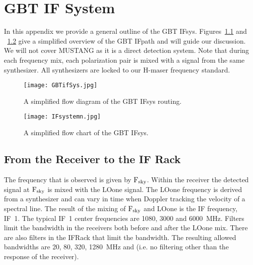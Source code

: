 \chapter{GBT IF System}\label{appendix:if}

In this appendix we provide a general outline of the \gls{GBT} \gls{IFsys}.
Figures~\ref{fig:ifpath} and ~\ref{fig:ifsys} give a simplified overview
of the \gls{GBT} \gls{IFpath} and will guide our discussion.  We will
not cover \gls{MUSTANG} as it is a direct detection system.  Note that during
each frequency mix, each polarization pair is mixed with a signal from the
same synthesizer. All synthesizers are locked to our H-maser frequency standard.

\begin{figure}[!h]
\begin{center}
\texttt{[image: GBTifSys.jpg]}
\caption[GBT IF system routing]
{A simplified flow diagram of the \gls{GBT} \gls{IFsys} routing.
\label{fig:ifpath}
}
\end{center}
\end{figure}

\begin{figure}[!h]
\begin{center}
\texttt{[image: IFsystemn.jpg]}
\caption[GBT IF system flow chart]
{A simplified flow chart of the \gls{GBT} \gls{IFsys}.
\label{fig:ifsys}
}
\end{center}
\end{figure}

\newpage
\section{From the Receiver to the IF Rack}

The frequency that is observed is given by ${\rm F_{sky}}$.  Within the receiver the
detected signal at ${\rm F_{sky}}$ is mixed with the \gls{LOone} signal.  The
\gls{LOone} frequency is derived from a synthesizer and can vary in time when
Doppler tracking the velocity of a spectral line.  The result of the mixing of
${\rm F_{sky}}$ and \gls{LOone} is the \gls{IF} frequency, IF~1. The typical IF~1
center frequencies are 1080, 3000 and 6000~MHz. Filters limit the bandwidth in
the receivers both before and after the \gls{LOone} mix.  There are also filters
in the \gls{IFRack} that limit the bandwidth.  The resulting allowed bandwidths
are 20, 80, 320, 1280~MHz and  (i.e. no filtering other than the
response of the receiver).  

